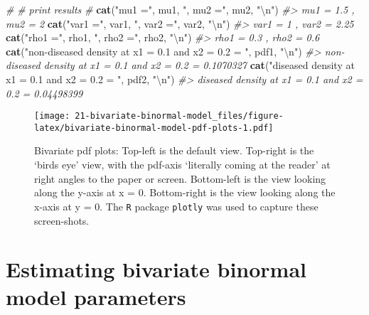 \documentclass[
]{book}
\newenvironment{Shaded}{\begin{snugshade}}{\end{snugshade}}
\newcommand{\CharTok}[1]{\textcolor[rgb]{0.31,0.60,0.02}{#1}}
\newcommand{\CommentTok}[1]{\textcolor[rgb]{0.56,0.35,0.01}{\textit{#1}}}
\newcommand{\KeywordTok}[1]{\textcolor[rgb]{0.13,0.29,0.53}{\textbf{#1}}}
\newcommand{\NormalTok}[1]{#1}
\newcommand{\StringTok}[1]{\textcolor[rgb]{0.31,0.60,0.02}{#1}}
\begin{document}
\begin{Shaded}
\begin{Highlighting}[]
\CommentTok{#}
\CommentTok{# print results}
\CommentTok{# }
\KeywordTok{cat}\NormalTok{(}\StringTok{"mu1 ="}\NormalTok{, mu1, }\StringTok{", mu2 ="}\NormalTok{, mu2, }\StringTok{"}\CharTok{\textbackslash{}n}\StringTok{"}\NormalTok{)}
\CommentTok{#> mu1 = 1.5 , mu2 = 2}
\KeywordTok{cat}\NormalTok{(}\StringTok{"var1 ="}\NormalTok{, var1, }\StringTok{", var2 ="}\NormalTok{, var2, }\StringTok{"}\CharTok{\textbackslash{}n}\StringTok{"}\NormalTok{)}
\CommentTok{#> var1 = 1 , var2 = 2.25}
\KeywordTok{cat}\NormalTok{(}\StringTok{"rho1 ="}\NormalTok{, rho1, }\StringTok{", rho2 ="}\NormalTok{, rho2, }\StringTok{"}\CharTok{\textbackslash{}n}\StringTok{"}\NormalTok{)}
\CommentTok{#> rho1 = 0.3 , rho2 = 0.6}
\KeywordTok{cat}\NormalTok{(}\StringTok{"non-diseased density at x1 = 0.1 and x2 = 0.2 = "}\NormalTok{, pdf1, }\StringTok{"}\CharTok{\textbackslash{}n}\StringTok{"}\NormalTok{)}
\CommentTok{#> non-diseased density at x1 = 0.1 and x2 = 0.2 =  0.1070327}
\KeywordTok{cat}\NormalTok{(}\StringTok{"diseased density at x1 = 0.1 and x2 = 0.2 = "}\NormalTok{, pdf2, }\StringTok{"}\CharTok{\textbackslash{}n}\StringTok{"}\NormalTok{)}
\CommentTok{#> diseased density at x1 = 0.1 and x2 = 0.2 =  0.04498399}
\end{Highlighting}
\end{Shaded}

\begin{figure}
\centering
\texttt{[image: 21-bivariate-binormal-model\_files/figure-latex/bivariate-binormal-model-pdf-plots-1.pdf]}
\caption{\label{fig:bivariate-binormal-model-pdf-plots}Bivariate pdf plots: Top-left is the default view. Top-right is the `birds eye' view, with the pdf-axis `literally coming at the reader' at right angles to the paper or screen. Bottom-left is the view looking along the y-axis at x = 0. Bottom-right is the view looking along the x-axis at y = 0. The \texttt{R} package \texttt{plotly} was used to capture these screen-shots.}
\end{figure}

\hypertarget{bivariate-binormal-model-multivariate-density-estimation}{%
\section{Estimating bivariate binormal model parameters}\label{bivariate-binormal-model-multivariate-density-estimation}}
\end{document}
